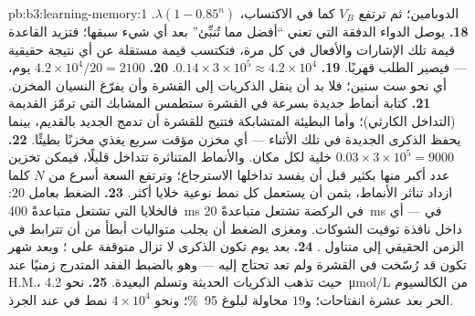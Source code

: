 \begin{solution}{pb:b3:learning-memory:1}
الدوبامين؛ ثم ترتفع $V_{B}$ كما في الاكتساب، $\lambda(1 -
0.85^{n})$.
\textbf{18.} يوصل الدواء الدفقة التي تعني ``أفضل مما تُنبِّئ''
بعد أي شيء سبقها؛ فتزيد القاعدة قيمة تلك الإشارات والأفعال
في كل مرة، فتكتسب قيمة مستقلة عن أي نتيجة حقيقية ---
فيصير الطلب قهريًا.
\textbf{19.} $0.14\times 3\times 10^{5} \approx 4.2\times 10^{4}$.
\textbf{20.} $4.2\times 10^{4}/20 = 2100$ يوم، أي نحو ست سنين؛
فلا بد أن ينقل  الذكريات إلى القشرة وأن يفرّغ النسيان
المخزن.
\textbf{21.} كتابة أنماط جديدة بسرعة في القشرة ستطمس المشابك
التي ترمّز القديمة (التداخل الكارثي)؛ وأما  البطيئة
المتشابكة فتتيح للقشرة أن تدمج الجديد بالقديم، بينما يحفظ
 الذكرى الجديدة في تلك الأثناء --- أي مخزن مؤقت سريع
يغذي مخزنًا بطيئًا.
\textbf{22.} $0.03\times 3\times 10^{5} = 9000$ خلية لكل مكان.
والأنماط المتناثرة تتداخل قليلًا، فيمكن تخزين عدد أكبر منها
بكثير قبل أن يفسد تداخلها الاسترجاع؛ وترتفع السعة أسرع من
$N$ كلما ازداد تناثر الأنماط، بثمن أن يستعمل كل نمط نوعية
خلايا أكثر.
\textbf{23.} الضغط بعامل $20$: فالخلايا التي تشتعل متباعدةً
\qty{400}{ms} في الركضة تشتعل متباعدةً \qty{20}{ms} في
 --- أي داخل نافذة توقيت الشوكات. ومغزى الضغط أن
يجلب متواليات أبطأ من أن تترابط في الزمن الحقيقي إلى متناول
.
\textbf{24.} بعد يوم تكون الذكرى لا تزال متوقفة على ؛
وبعد شهر تكون قد رُسّخت في القشرة ولم تعد تحتاج إليه ---
وهو بالضبط الفقد المتدرج زمنيًا عند H.M.، حيث تذهب الذكريات
الحديثة وتسلم البعيدة.
\textbf{25.} نحو \qty{4.2}{\micro mol/L} من الكالسيوم الحر بعد
عشرة انفتاحات؛ و$19$ محاولة لبلوغ \qty{95}{\%}؛ ونحو
$4\times 10^{4}$ نمط في  عند الجرذ.
\end{solution}
